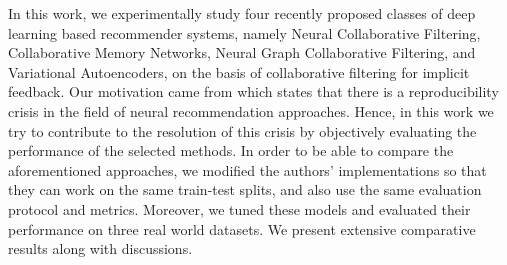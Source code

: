 In this work, we experimentally study four recently proposed classes of deep learning based recommender systems, namely Neural Collaborative Filtering, Collaborative Memory Networks, Neural Graph Collaborative Filtering, and Variational Autoencoders, on the basis of collaborative filtering for implicit feedback.
Our motivation came from \cite{dacrema2019we} which states that there is a reproducibility crisis in the field of neural recommendation approaches.
Hence, in this work we try to contribute to the resolution of this crisis by objectively evaluating the performance of the selected methods.
In order to be able to compare the aforementioned approaches, we modified the authors' implementations so that they can work on the same train-test splits, and also use the same evaluation protocol and metrics.
Moreover, we tuned these models and evaluated their performance on three real world datasets.
We present extensive comparative results along with discussions.
